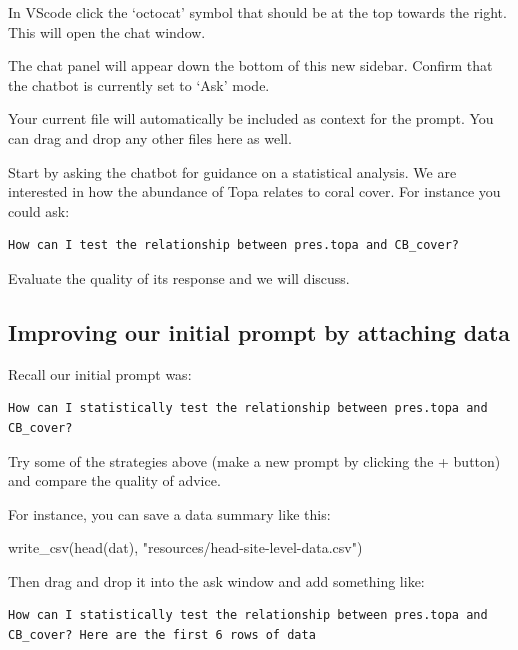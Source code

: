 \documentclass[
  letterpaper,
  DIV=11,
  numbers=noendperiod]{scrreprt}
\newenvironment{Shaded}{\begin{snugshade}}{\end{snugshade}}
\newcommand{\FunctionTok}[1]{\textcolor[rgb]{0.28,0.35,0.67}{#1}}
\newcommand{\NormalTok}[1]{\textcolor[rgb]{0.00,0.23,0.31}{#1}}
\newcommand{\StringTok}[1]{\textcolor[rgb]{0.13,0.47,0.30}{#1}}
\begin{document}
In VScode click the `octocat' symbol that should be at the top towards
the right. This will open the chat window.

The chat panel will appear down the bottom of this new sidebar. Confirm
that the chatbot is currently set to `Ask' mode.

Your current file will automatically be included as context for the
prompt. You can drag and drop any other files here as well.

Start by asking the chatbot for guidance on a statistical analysis. We
are interested in how the abundance of Topa relates to coral cover. For
instance you could ask:

\begin{verbatim}
How can I test the relationship between pres.topa and CB_cover?
\end{verbatim}

Evaluate the quality of its response and we will discuss.

\subsection{Improving our initial prompt by attaching
data}\label{improving-our-initial-prompt-by-attaching-data}

Recall our initial prompt was:

\begin{verbatim}
How can I statistically test the relationship between pres.topa and CB_cover?
\end{verbatim}

Try some of the strategies above (make a new prompt by clicking the +
button) and compare the quality of advice.

For instance, you can save a data summary like this:

\begin{Shaded}
\begin{Highlighting}[]
\FunctionTok{write\_csv}\NormalTok{(}\FunctionTok{head}\NormalTok{(dat), }\StringTok{"resources/head{-}site{-}level{-}data.csv"}\NormalTok{)}
\end{Highlighting}
\end{Shaded}

Then drag and drop it into the ask window and add something like:

\begin{verbatim}
How can I statistically test the relationship between pres.topa and CB_cover? Here are the first 6 rows of data
\end{verbatim}
\end{document}
